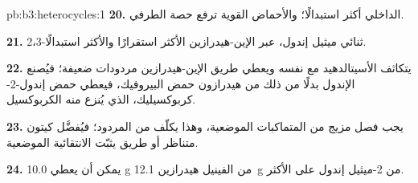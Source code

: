 \begin{solution}{pb:b3:heterocycles:1}
\textbf{20.} الداخلي أكثر استبدالًا؛ والأحماض القوية ترفع حصة
الطرفي.

\textbf{21.} 2،3-ثنائي ميثيل إندول، عبر الإين-هيدرازين الأكثر استقرارًا والأكثر
استبدالًا.

\textbf{22.} يتكاثف الأسيتالدهيد مع نفسه ويعطي طريق الإين-هيدرازين مردودات
ضعيفة؛ فيُصنع الإندول بدلًا من ذلك من هيدرازون حمض البيروفيك، فيعطي
حمض إندول-2-كربوكسيليك، الذي يُنزع منه الكربوكسيل.

\textbf{23.} يجب فصل مزيج من المتماكبات الموضعية، وهذا يكلّف من المردود؛ فيُفضَّل
كيتون متناظر أو طريق يثبّت الانتقائية الموضعية.

\textbf{24.} يمكن أن يعطي 10.0 g من الفينيل هيدرازين \qty{12.1}{g} من 2-ميثيل إندول على الأكثر.
\end{solution}
